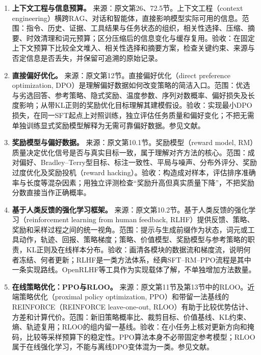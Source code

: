 \documentclass[UTF8,12pt,a4paper,fontset=fandol]{ctexart}
\begin{document}
\begin{enumerate}[resume=techrank]
\item \textbf{上下文工程与信息预算。}\label{tech:context}
来源：原文第26、72.5节。上下文工程（context engineering）横跨RAG、对话和智能体，直接影响模型实际可用的信息。范围：指令、历史、证据、工具结果与任务状态的组织，相关性选择、压缩、摘要、时效清理和词元预算；区分压缩后的信息变化与缓存复用。验收：在固定上下文预算下比较全文堆入、相关性选择和摘要方案，检查关键约束、来源与否定信息是否丢失，并保留可追溯的原始记录。

\item \textbf{直接偏好优化。}\label{tech:dpo}
来源：原文第12节。直接偏好优化（direct preference optimization, DPO）是理解偏好数据如何改变策略的简洁入口。范围：优选与劣选回答、参考策略、隐式奖励、温度参数、序列对数概率、偏好损失及长度影响；从带KL正则的奖励优化目标理解其建模假设。验收：实现最小DPO损失，在同一SFT起点上对照训练，独立评估任务质量和偏好变化；不把无需单独训练显式奖励模型解释为无需可靠偏好数据。参见文献\cite{dpo}。

\item \textbf{奖励模型与偏好数据。}\label{tech:reward}
来源：原文第10.1节。奖励模型（reward model, RM）质量决定优化信号是否与真实目标一致，属于理解对齐方法的核心。范围：成对偏好、Bradley--Terry型目标、标注一致性、平局与噪声、分布外评分、奖励过度优化及奖励投机（reward hacking）。验收：构造成对样本，评估排序准确率与长度等混杂因素；用独立评测检查“奖励升高但真实质量下降”，不把奖励分数直接当作正确概率。

\item \textbf{基于人类反馈的强化学习框架。}\label{tech:rlhf}
来源：原文第10.2节。基于人类反馈的强化学习（reinforcement learning from human feedback, RLHF）提供反馈、策略、奖励和采样过程之间的统一视角。范围：提示与生成前缀作为状态，词元或工具动作，轨迹、回报、策略梯度；策略、价值模型、奖励模型与参考策略的职责，KL正则及在线样本分布。验收：画清各模块的数据流和梯度流，说明何者冻结、何者更新；RLHF是一类方法体系，经典SFT--RM--PPO流程是其中一条实现路线。OpenRLHF等工具作为实现载体了解，不单独增加方法数量。

\item \textbf{在线策略优化：PPO与RLOO。}\label{tech:policy}
来源：原文第11节及第13节中的RLOO。近端策略优化（proximal policy optimization, PPO）和带留一法基线的REINFORCE（REINFORCE leave-one-out, RLOO）有助于比较优势估计、方差和计算代价。范围：新旧策略概率比、裁剪目标、价值基线、KL约束、熵、轨迹复用；RLOO的组内留一基线。验收：在小任务上核对更新方向和掩码，比较等采样预算下的稳定性。PPO算法本身不必带固定参考模型；RLOO属于在线强化学习，不能与离线DPO变体混为一类。参见文献\cite{rloo}。


\end{enumerate}
\end{document}
